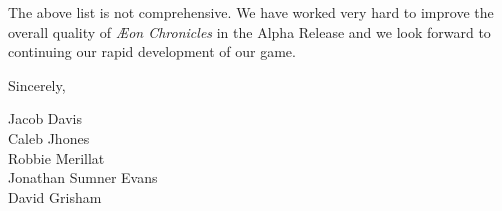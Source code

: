 \documentclass[12pt]{article}
\newcommand\aeon{\textit{\AE on Chronicles}\xspace}
\newcommand\tab[1][.5in]{\hspace*{#1}}
\newcommand\releasename{Alpha Release\xspace}
\begin{document}
The above list is not comprehensive. We have worked very hard to improve the
overall quality of \aeon in the \releasename and we look forward to continuing
our rapid development of our game.

Sincerely,

\tab Jacob Davis \\
\tab Caleb Jhones \\
\tab Robbie Merillat \\
\tab Jonathan Sumner Evans \\
\tab David Grisham \\
\end{document}
